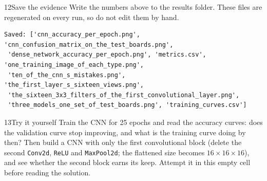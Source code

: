 
\begin{labquestion}{12}{Save the evidence}
Write the numbers above to the results folder. These files are regenerated on every run, so do not edit them by hand.
\end{labquestion}
\begin{labanswer}

\begin{refoutput}
\begin{lstlisting}[style=utpterminal]
Saved: ['cnn_accuracy_per_epoch.png', 'cnn_confusion_matrix_on_the_test_boards.png',
 'dense_network_accuracy_per_epoch.png', 'metrics.csv', 'one_training_image_of_each_type.png',
 'ten_of_the_cnn_s_mistakes.png', 'the_first_layer_s_sixteen_views.png',
 'the_sixteen_3x3_filters_of_the_first_convolutional_layer.png',
 'three_models_one_set_of_test_boards.png', 'training_curves.csv']
\end{lstlisting}
\end{refoutput}
\end{labanswer}


\begin{labquestion}{13}{Try it yourself}
Train the CNN for 25 epochs and read the accuracy curves: does the validation curve stop improving, and what is the training curve doing by then? Then build a CNN with only the first convolutional block (delete the second \texttt{Conv2d}, \texttt{ReLU} and \texttt{MaxPool2d}; the flattened size becomes $16\times16\times16$), and see whether the second block earns its keep. Attempt it in this empty cell before reading the solution.
\end{labquestion}

